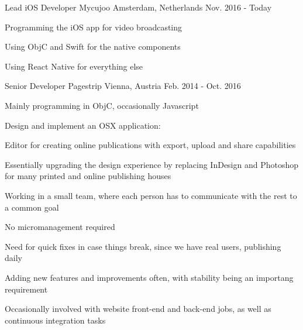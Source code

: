 
\begin{cventries}

  \cventry
    {Lead iOS Developer} %
    {Mycujoo} %
    {Amsterdam, Netherlands} %
    {Nov. 2016 - Today} %
    {
      \begin{cvitems} %
        \item {Programming the iOS app for video broadcasting}
        \item {Using ObjC and Swift for the native components}
        \item {Using React Native for everything else}
      \end{cvitems}
    }

  \cventry
    {Senior Developer} %
    {Pagestrip} %
    {Vienna, Austria} %
    {Feb. 2014 - Oct. 2016} %
    {
      \begin{cvitems} %
        \item {Mainly programming in ObjC, occasionally Javascript}
      \item {Design and implement an OSX application:}
		\item {Editor for creating online publications with export, upload and share capabilities}
		\item {Essentially upgrading the design experience by replacing InDesign and Photoshop for many printed and online publishing houses}
		\item {Working in a small team, where each person has to communicate with the rest to a common goal}
		\item {No micromanagement required}
		\item {Need for quick fixes in case things break, since we have real users, publishing daily}
		\item {Adding new features and improvements often, with stability being an importang requirement}
        \item {Occasionally involved with website front-end and back-end jobs, as well as continuous integration tasks}
      \end{cvitems}
    }


\end{cventries}
